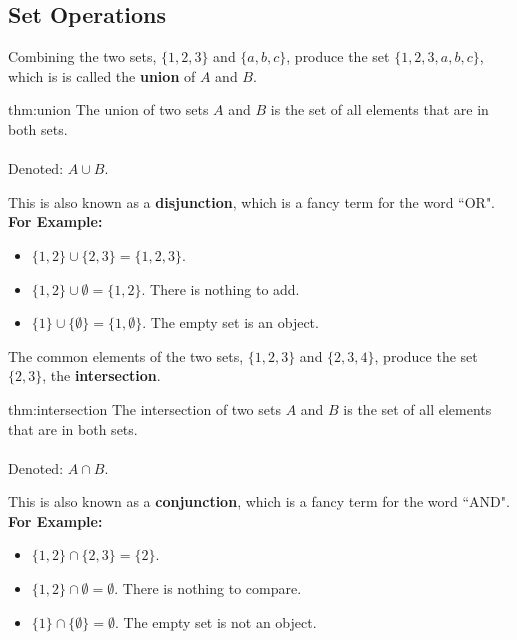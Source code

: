 \subsection{Set Operations}


Combining the two sets, $\{1,2,3\}$ and $\{a,b,c\}$, produce the set $\{1,2,3,a,b,c\}$, which is
is called the \textbf{union} of $A$ and $B$.\\

\begin{theo}[Union]{thm:union}
    The union of two sets $A$ and $B$ is the set of all elements that are in both sets.\\\\
    Denoted: $A \cup B$.
\end{theo}

\noindent
This is also known as a \textbf{disjunction}, which is a fancy term for the word ``OR".\\

\noindent
\textbf{For Example:}
\begin{itemize}
    \item $\{1, 2\} \cup \{2, 3\} = \{1, 2, 3\}$.
    \item $\{1,2\} \cup \emptyset = \{1, 2\}$. There is nothing to add.
    \item $\{1\} \cup \{\emptyset\} = \{1, \emptyset\}$. The empty set is an object.
\end{itemize}

\noindent
The common elements of the two sets, $\{1,2,3\}$ and $\{2,3,4\}$, produce the set $\{2,3\}$,
the \textbf{intersection}.\\

\begin{theo}[Intersection]{thm:intersection}
    The intersection of two sets $A$ and $B$ is the set of all elements that are in both sets.\\\\
    Denoted: $A \cap B$.
\end{theo}

\noindent
This is also known as a \textbf{conjunction}, which is a fancy term for the word ``AND".\\

\textbf{For Example:}
\begin{itemize}
    \item $\{1, 2\} \cap \{2, 3\} = \{2\}$.
    \item $\{1,2\} \cap \emptyset = \emptyset$. There is nothing to compare.
    \item $\{1\} \cap \{\emptyset\} = \emptyset$. The empty set is not an object.
\end{itemize}

